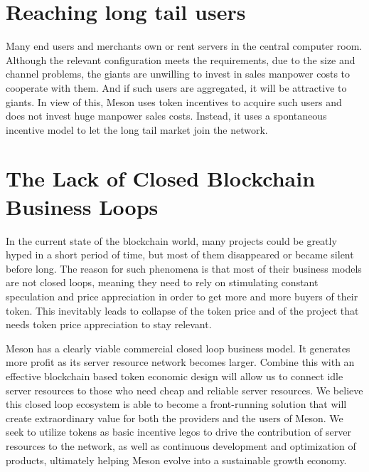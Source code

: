 \documentclass[12pt, a4paper, unicode]{report}
\begin{document}
    \section{Reaching long tail users}
    Many end users and merchants own or rent servers in the central computer room. Although the relevant configuration meets the requirements, due to the size and channel problems, the giants are unwilling to invest in sales manpower costs to cooperate with them. And if such users are aggregated, it will be attractive to giants. In view of this, Meson uses token incentives to acquire such users and does not invest huge manpower sales costs. Instead, it uses a spontaneous incentive model to let the long tail market join the network.
    
    \section{The Lack of Closed Blockchain Business Loops}
    In the current state of the blockchain world, many projects could be greatly hyped in a short period of time, but most of them disappeared or became silent before long. The reason for such phenomena is that most of their business models are not closed loops, meaning they need to rely on stimulating constant speculation and price appreciation in order to get more and more buyers of their token. This inevitably leads to collapse of the token price and of the project that needs token price appreciation to stay relevant. 
    
    Meson has a clearly viable commercial closed loop business model. It generates more profit as its server resource network becomes larger. Combine this with an effective blockchain based token economic design will allow us to connect idle server resources to those who need cheap and reliable server resources. We believe this closed loop ecosystem is able to become a front-running solution that will create extraordinary value for both the providers and the users of Meson. We seek to utilize tokens as basic incentive legos to drive the contribution of server resources to the network, as well as continuous development and optimization of products, ultimately helping Meson evolve into a sustainable growth economy.
\end{document}
